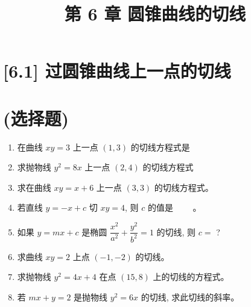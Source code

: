 \documentclass[10pt]{article}
\title{第 6 章 圆锥曲线的切线 }
\author{}
\date{}
\begin{document}
\maketitle
\section*{[6.1] 过圆锥曲线上一点的切线}
\section*{(选择题)}
\begin{enumerate}
  \item 在曲线 $x y=3$ 上一点 $(1,3)$ 的切线方程式是 $\qquad$
  \item 求抛物线 $y^{2}=8 x$ 上一点 $(2,4)$ 的切线方程式
  \item 求在曲线 $x y=x+6$ 上一点 $(3,3)$ 的切线方程式。
  \item 若直线 $y=-x+c$ 切 $x y=4$, 则 $c$ 的值是 $\qquad$。
  \item 如果 $y=m x+c$ 是椭圆 $\dfrac{x^{2}}{a^{2}}+\dfrac{y^{2}}{b^{2}}=1$ 的切线, 则 $c=$ ?
  \item 求曲线 $x y=2$ 上点 $(-1,-2)$ 的切线。
  \item 求抛物线 $y^{2}=4 x+4$ 在点 $(15,8)$ 上的切线的方程式。
  \item 若 $m x+y=2$ 是抛物线 $y^{2}=6 x$ 的切线, 求此切线的斜率。
\end{enumerate}
\end{document}
